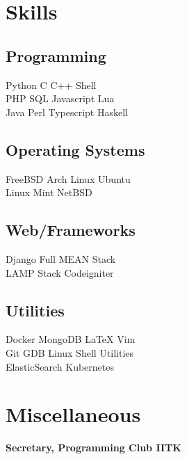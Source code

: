 \documentclass[]{deedy-resume-openfont}
\begin{document}
\begin{minipage}[t]{0.30\textwidth}

\section{Skills}
\subsection{Programming}
Python \textbullet{} C \textbullet{} C++ \textbullet{} Shell \\
 \vspace{0.1 cm}
PHP \textbullet{} SQL \textbullet{} Javascript \textbullet{}  Lua \\
 Java \textbullet{} Perl \textbullet{} Typescript \textbullet{} Haskell \\
\vspace{0.4 cm}
\subsection{Operating Systems}
FreeBSD \textbullet{} Arch Linux \textbullet{} Ubuntu \\
Linux Mint \textbullet{} NetBSD
\vspace{0.4 cm} 
\subsection{Web/Frameworks}
Django \textbullet{} Full MEAN Stack \\
LAMP Stack \textbullet{} Codeigniter \\
\vspace{0.4 cm}
\subsection{Utilities}
Docker \textbullet{} MongoDB \textbullet{} \LaTeX{} \textbullet{} Vim \\
Git \textbullet{} GDB \textbullet{} Linux Shell Utilities \\
ElasticSearch \textbullet{} Kubernetes \\


\vspace{0.2cm}
\section{Miscellaneous}
\textbf{Secretary, Programming Club IITK}
\vspace{0.1cm}


\end{minipage}
\end{document}
